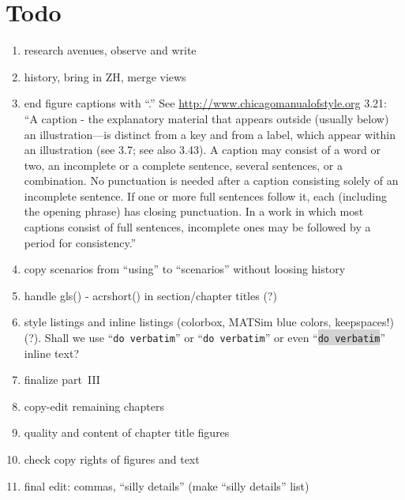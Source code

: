 \section*{Todo}

\begin{enumerate}\styleEnumerate

\item research avenues, observe and write

\item history, bring in ZH, merge views

\item end figure captions with ``.'' See \url{http://www.chicagomanualofstyle.org} 3.21: ``A caption - the explanatory material that appears outside (usually below) an illustration—is distinct from a key and from a label, which appear within an illustration (see 3.7; see also 3.43). A caption may consist of a word or two, an incomplete or a complete sentence, several sentences, or a combination. No punctuation is needed after a caption consisting solely of an incomplete sentence. If one or more full sentences follow it, each (including the opening phrase) has closing punctuation. In a work in which most captions consist of full sentences, incomplete ones may be followed by a period for consistency.''

\item copy scenarios from ``using'' to ``scenarios'' without loosing history

\item handle gls() - acrshort() in section/chapter titles (?)

\item style listings and inline listings (colorbox, MATSim blue colors, keepspaces!) (?). Shall we use ``\verb|do verbatim|'' or ``\lstinline|do verbatim|'' or even ``\colorbox{lightgray}{\lstinline|do verbatim|}'' inline text?

\item finalize part~III

\item copy-edit remaining chapters

\item quality and content of chapter title figures

\item check copy rights of figures and text

\item final edit: commas, ``silly details'' (make ``silly details'' list)


\end{enumerate}
